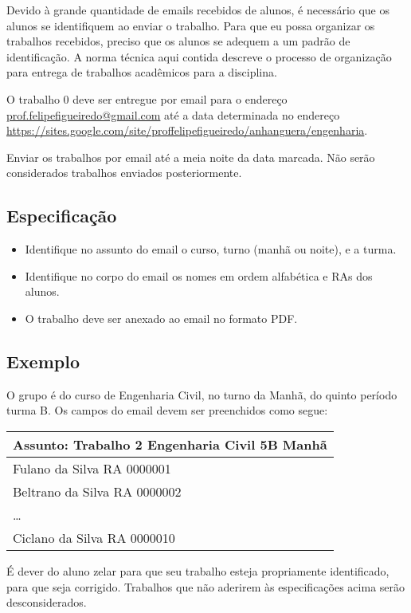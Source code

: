 \documentclass[a4paper]{article}
\begin{document}
Devido à grande quantidade de emails recebidos de alunos, é necessário
que os alunos se identifiquem ao enviar o trabalho. Para que eu possa
organizar os trabalhos recebidos, preciso que os alunos se adequem a
um padrão de identificação. A norma técnica aqui contida descreve o
processo de organização para entrega de trabalhos acadêmicos para a
disciplina.

O trabalho 0 deve ser entregue por email para o endereço
\url{prof.felipefigueiredo@gmail.com} até a data determinada no
endereço
\url{https://sites.google.com/site/proffelipefigueiredo/anhanguera/engenharia}.
 
Enviar os trabalhos por email até a meia noite da data marcada. Não
serão considerados trabalhos enviados posteriormente.

\subsection{Especificação}

\begin{itemize}
\item Identifique no assunto do email o curso, turno (manhã ou noite),
  e a turma.
\item Identifique no corpo do email os nomes em ordem alfabética e RAs
  dos alunos.
\item O trabalho deve ser anexado ao email no formato PDF.
\end{itemize}

\subsection{Exemplo}

O grupo é do curso de Engenharia Civil, no turno da Manhã, do quinto
período turma B. Os campos do email devem ser preenchidos como segue:

\begin{tabular}{|l|}
  \hline
  Assunto: Trabalho 2 Engenharia Civil 5B Manhã\\
  \hline
  Fulano da Silva RA 0000001 \\
  Beltrano da Silva RA 0000002 \\
  \ldots \\
  Ciclano da Silva RA 0000010  \\
  \hline
\end{tabular}
 
É dever do aluno zelar para que seu trabalho esteja propriamente
identificado, para que seja corrigido. Trabalhos que não aderirem às
especificações acima serão desconsiderados.
 
\end{document}
